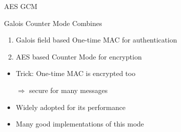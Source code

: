 \documentclass[aspectratio=169, lualatex, 10pt,dvipsnames,svgnames]{beamer} %
\def\enrouge#1{\textcolor{rouge}{#1}}
\begin{document}
\begin{frame}{AES GCM}

  \begin{block}{Galois Counter Mode}
    Combines
    \begin{enumerate}
    \item \enrouge{Galois field} based One-time MAC for authentication
    \item \enrouge{AES} based Counter Mode for encryption
    \end{enumerate}
  \end{block}
  \bigskip{}

  \begin{itemize}
  \item \enrouge{Trick}: One-time MAC is encrypted too

    $\Rightarrow$ secure for many messages
    
  \item Widely adopted for its performance
    
  \item Many good implementations of this mode
  \end{itemize}
  
\end{frame}
\end{document}
